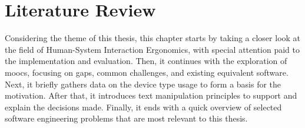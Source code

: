 \chapter{Literature Review}

Considering the theme of this thesis, this chapter starts by taking a closer look at the field of Human-System Interaction Ergonomics, with special attention paid to the implementation and evaluation.
Then, it continues with the exploration of \glspl{mooc}, focusing on gaps, common challenges, and existing equivalent software.
Next, it briefly gathers data on the device type usage to form a basis for the motivation.
After that, it introduces text manipulation principles to support and explain the decisions made.
Finally, it ends with a quick overview of selected software engineering problems that are most relevant to this thesis.











